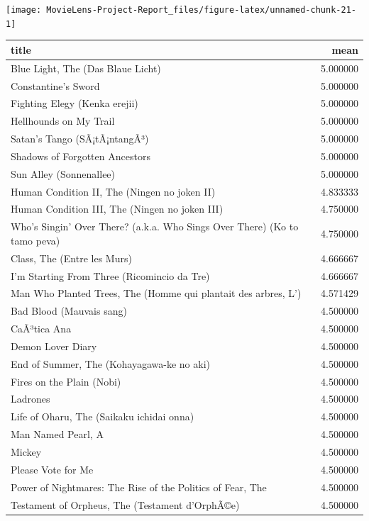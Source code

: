 \documentclass[
]{article}
\begin{document}
\begin{center}\texttt{[image: MovieLens-Project-Report\_files/figure-latex/unnamed-chunk-21-1]} \end{center}

\begin{table}
\centering\begingroup\fontsize{10}{12}\selectfont

\begin{tabular}{l|r}
\hline
title & mean\\
\hline
Blue Light, The (Das Blaue Licht) & 5.000000\\
\hline
Constantine's Sword & 5.000000\\
\hline
Fighting Elegy (Kenka erejii) & 5.000000\\
\hline
Hellhounds on My Trail & 5.000000\\
\hline
Satan's Tango (SÃ¡tÃ¡ntangÃ³) & 5.000000\\
\hline
Shadows of Forgotten Ancestors & 5.000000\\
\hline
Sun Alley (Sonnenallee) & 5.000000\\
\hline
Human Condition II, The (Ningen no joken II) & 4.833333\\
\hline
Human Condition III, The (Ningen no joken III) & 4.750000\\
\hline
Who's Singin' Over There? (a.k.a. Who Sings Over There) (Ko to tamo peva) & 4.750000\\
\hline
Class, The (Entre les Murs) & 4.666667\\
\hline
I'm Starting From Three (Ricomincio da Tre) & 4.666667\\
\hline
Man Who Planted Trees, The (Homme qui plantait des arbres, L') & 4.571429\\
\hline
Bad Blood (Mauvais sang) & 4.500000\\
\hline
CaÃ³tica Ana & 4.500000\\
\hline
Demon Lover Diary & 4.500000\\
\hline
End of Summer, The (Kohayagawa-ke no aki) & 4.500000\\
\hline
Fires on the Plain (Nobi) & 4.500000\\
\hline
Ladrones & 4.500000\\
\hline
Life of Oharu, The (Saikaku ichidai onna) & 4.500000\\
\hline
Man Named Pearl, A & 4.500000\\
\hline
Mickey & 4.500000\\
\hline
Please Vote for Me & 4.500000\\
\hline
Power of Nightmares: The Rise of the Politics of Fear, The & 4.500000\\
\hline
Testament of Orpheus, The (Testament d'OrphÃ©e) & 4.500000\\
\hline
\end{tabular}
\endgroup{}
\end{table}
\end{document}
